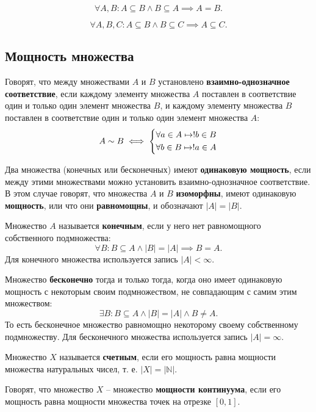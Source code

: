 \begin{property}
    \[
        \forall A, B : A \subseteq B \land B \subseteq A \implies A = B.
    \]
\end{property}

\begin{property}
    \[
        \forall A, B, C : A \subseteq B \land B \subseteq C \implies A \subseteq C.
    \]
\end{property}

\subsection{Мощность множества}

Говорят, что между множествами \(A\) и \(B\) установлено \textbf{взаимно-однозначное соответствие}, если каждому элементу множества \(A\) поставлен в соответствие один и только один элемент множества \(B\), и каждому элементу множества \(B\) поставлен в соответствие один и только один элемент множества \(A\):
\[
    A \sim B
    \iff
    \begin{dcases}
        \forall a \in A \mapsto !b \in B \\
        \forall b \in B \mapsto !a \in A
    \end{dcases}
\]

Два множества (конечных или бесконечных) имеют \textbf{одинаковую мощность}, если между этими множествами можно установить взаимно-однозначное соответствие. В этом случае говорят, что множества \(A\) и \(B\) \textbf{изоморфны}, имеют одинаковую \textbf{мощность}, или что они \textbf{равномощны}, и обозначают \(|A| = |B|\).

Множество \(A\) называется \textbf{конечным}, если у него нет равномощного собственного подмножества:
\[
    \forall B: B \subseteq A \land |B| = |A| \implies B = A.
\]
Для конечного множества используется запись \(|A| < \infty\).

Множество \textbf{бесконечно} тогда и только тогда, когда оно имеет одинаковую мощность с некоторым своим подмножеством, не совпадающим с самим этим множеством:
\[
    \exists B: B \subseteq A \land |B| = |A| \land B \neq A.
\]
То есть бесконечное множество равномощно некоторому своему собственному подмножеству. Для бесконечного множества используется запись \(|A| = \infty\).

Множество \(X\) называется \textbf{счетным}, если его мощность равна мощности множества натуральных чисел, т. е. \(|X| = |\mathbb{N}|\).

Говорят, что множество \(X\) -- множество \textbf{мощности континуума}, если его мощность равна мощности множества точек на отрезке \([0, 1]\).

